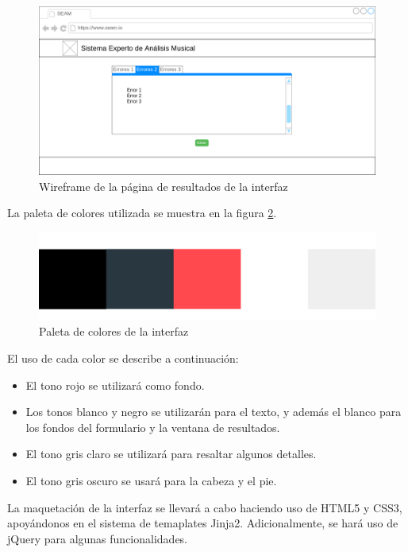 \begin{figure}[H]
	\centering
	\includegraphics[scale=0.4]{imagenes/interfaz2.png}
	\caption{Wireframe de la página de resultados de la interfaz}
	\label{fig4.1.2.2}
\end{figure}

\bigskip
La paleta de colores utilizada se muestra en la figura \ref{fig4.1.2.3}.

\begin{figure}[H]
 	\centering
	\includegraphics[scale=0.2]{imagenes/paleta.png}
	\caption{Paleta de colores de la interfaz}
	\label{fig4.1.2.3}
\end{figure}

El uso de cada color se describe a continuación:

\begin{itemize}
	
	\item El tono rojo se utilizará como fondo.
	\item Los tonos blanco y negro se utilizarán para el texto, y además el blanco para los fondos del formulario y la ventana de resultados.
	\item El tono gris claro se utilizará para resaltar algunos detalles.
	\item El tono gris oscuro se usará para la cabeza y el pie.
\end{itemize}

La maquetación de la interfaz se llevará a cabo haciendo uso de HTML5 y CSS3, apoyándonos en el sistema de temaplates Jinja2. Adicionalmente, se hará uso de jQuery para algunas funcionalidades.

